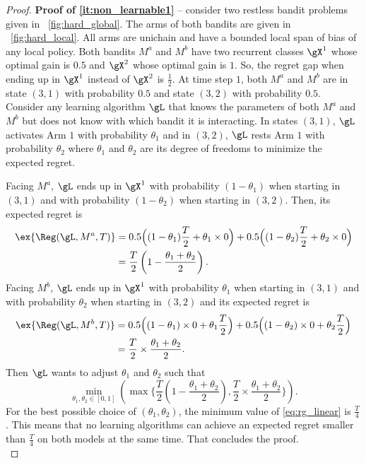 \begin{proof}
    \textbf{Proof of \ref{it:non_learnable1}} -- consider two restless bandit problems given in \figurename~\ref{fig:hard_global}.
    The arms of both bandits are given in \figurename~\ref{fig:hard_local}.
    All arms are unichain and have a bounded local span of bias of any local policy.
    Both bandits $M^a$ and $M^b$ have two recurrent classes $\gX^1$ whose optimal gain is $0.5$ and $\gX^2$ whose optimal gain is $1$.
    So, the regret gap when ending up in $\gX^1$ instead of $\gX^2$ is $\frac12$.
    At time step $1$, both $M^a$ and $M^b$ are in state $(3,1)$ with probability $0.5$ and state $(3,2)$ with probability $0.5$.
    Consider any learning algorithm $\gL$ that knows the parameters of both $M^a$ and $M^b$ but does not know with which bandit it is interacting.
    In states $(3,1)$, $\gL$ activates Arm $1$ with probability $\theta_1$ and in $(3,2)$, $\gL$  rests Arm $1$ with probability $\theta_2$ where $\theta_1$ and $\theta_2$ are its degree of freedoms to minimize the expected regret.

    Facing $M^a$, $\gL$ ends up in $\gX^1$ with probability $(1-\theta_1)$ when starting in $(3,1)$ and with probability $(1-\theta_2)$ when starting in $(3,2)$.
    Then, its expected regret is
    \begin{align*}
        \ex{\Reg(\gL,M^a,T)}
        &=0.5\Bigl((1-\theta_1)\frac{T}2 +\theta_1\times 0\Bigr) +0.5\Bigl((1-\theta_2)\frac{T}2 +\theta_2\times 0\Bigr)\\
        &=\frac{T}2\left(1-\frac{\theta_1+\theta_2}2\right).
    \end{align*}
    Facing $M^b$, $\gL$ ends up in $\gX^1$ with probability $\theta_1$ when starting in $(3,1)$ and with probability $\theta_2$ when starting in $(3,2)$ and its expected regret is
    \begin{align*}
        \ex{\Reg(\gL,M^b,T)}
        &=0.5\Bigl((1-\theta_1)\times 0 +\theta_1\frac{T}2\Bigr) +0.5\Bigl((1-\theta_2)\times 0 +\theta_2\frac{T}2\Bigr)\\
        &=\frac{T}2\times\frac{\theta_1+\theta_2}2.
    \end{align*}
    Then $\gL$ wants to adjust $\theta_1$ and $\theta_2$ such that
    \begin{equation}
        \label{eq:rg_linear}
        \min_{\theta_1,\theta_2\in[0,1]}\left(\max\biggl\{\frac{T}2\left(1-\frac{\theta_1+\theta_2}2\right), \frac{T}2\times\frac{\theta_1+\theta_2}2\biggr\}\right).
    \end{equation}
    For the best possible choice of $(\theta_1,\theta_2)$, the minimum value of \eqref{eq:rg_linear} is $\displaystyle\frac{T}4$.
    This means that no learning algorithms can achieve an expected regret smaller than $\frac{T}4$ on both models at the same time.
    That concludes the proof.
    \medskip \\



\end{proof}
